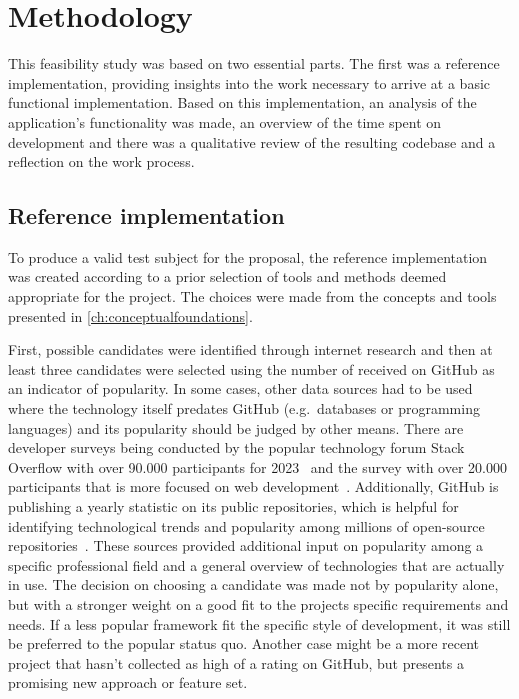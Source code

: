 \chapter{Methodology}
\label{ch:methodology}

This feasibility study was based on two essential parts.
The first was a reference implementation, providing insights into the work necessary to arrive at a basic functional implementation.
Based on this implementation, an analysis of the application's functionality was made, an overview of the time spent on development and there was a qualitative review of the resulting codebase and a reflection on the work process.

\section{Reference implementation}
\label{sec:reference-implementation}

To produce a valid test subject for the proposal, the reference implementation was created according to a prior selection of tools and methods deemed appropriate for the project.
The choices were made from the concepts and tools presented in \autoref{ch:conceptualfoundations}.

First, possible candidates were identified through internet research and then at least three candidates were selected using the number of  received on GitHub as an indicator of popularity.
In some cases, other data sources had to be used where the technology itself predates GitHub (e.g.\ databases or programming languages) and its popularity should be judged by other means.
There are developer surveys being conducted by the popular technology forum Stack Overflow with over 90.000 participants for 2023~\parencite{stackOverflowPoll} and the  survey with over 20.000 participants that is more focused on web development~\parencite{stateOfJSSurvey}.
Additionally, GitHub is publishing a yearly statistic on its public repositories, which is helpful for identifying technological trends and popularity among millions of open-source repositories~\parencite{stateOfTheOctoverse23}.
These sources provided additional input on popularity among a specific professional field and a general overview of technologies that are actually in use.
The decision on choosing a candidate was made not by popularity alone, but with a stronger weight on a good fit to the project\textquotesingle s specific requirements and needs.
If a less popular framework fit the specific style of development, it was still be preferred to the popular status quo.
Another case might be a more recent project that hasn't collected as high of a rating on GitHub, but presents a promising new approach or feature set.

